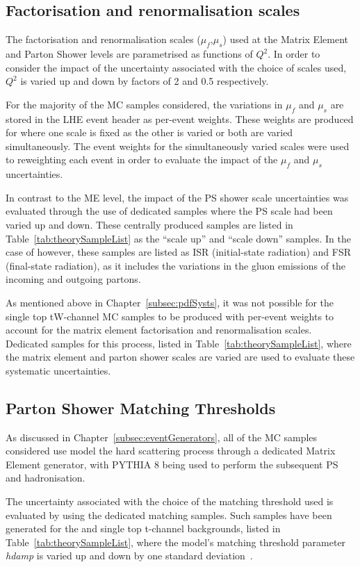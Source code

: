 \subsection{Factorisation and renormalisation scales}
The factorisation and renormalisation scales ($\mu_{f}$,$\mu_{s}$) used at the Matrix Element and Parton Shower levels are parametrised as functions of $Q^{2}$.
In order to consider the impact of the uncertainty associated with the choice of scales used, $Q^{2}$ is varied up and down by factors of 2 and 0.5 respectively.

For the majority of the MC samples considered, the variations in $\mu_{f}$ and $\mu_{s}$ are stored in the LHE event header as per-event weights.
These weights are produced for where one scale is fixed as the other is varied or both are varied simultaneously.
The event weights for the simultaneously varied scales were used to reweighting each event in order to evaluate the impact of the $\mu_{f}$ and $\mu_{s}$ uncertainties.

In contrast to the ME level, the impact of the PS shower scale uncertainties was evaluated through the use of dedicated samples where the PS scale had been varied up and down.
These centrally produced samples are listed in Table~\ref{tab:theorySampleList} as the ``scale up'' and ``scale down'' samples.
In the case of \ttbar however, these samples are listed as ISR (initial-state radiation) and FSR (final-state radiation), as it includes the variations in the gluon emissions of the incoming and outgoing partons.

As mentioned above in Chapter~\ref{subsec:pdfSysts}, it was not possible for the single top tW-channel MC samples to be produced with per-event weights to account for the matrix element factorisation and renormalisation scales.
Dedicated samples for this process, listed in Table~\ref{tab:theorySampleList}, where the matrix element and parton shower scales are varied are used to evaluate these systematic uncertainties.

\subsection{Parton Shower Matching Thresholds}
As discussed in Chapter~\ref{subsec:eventGenerators}, all of the MC samples considered use model the hard scattering process through a dedicated Matrix Element generator, with PYTHIA 8 being used to perform the subsequent PS and hadronisation.

The uncertainty associated with the choice of the matching threshold used is evaluated by using the dedicated matching samples.
Such samples have been generated for the \ttbar and single top t-channel backgrounds, listed in Table~\ref{tab:theorySampleList}, where the model's matching threshold parameter \emph{hdamp} is varied up and down by one standard deviation~\cite{CMS:2016kle}.

